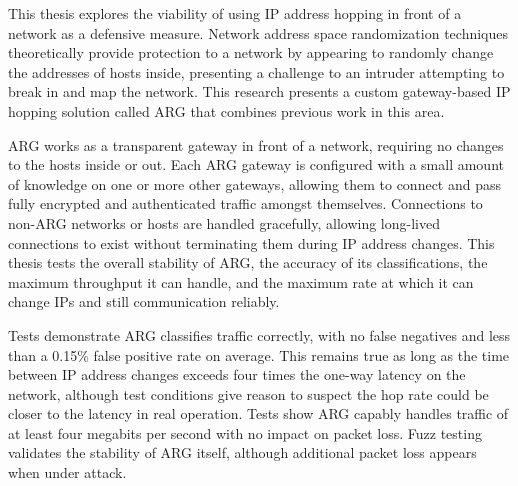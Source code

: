 \par This thesis explores the viability of using \ac{IP} address hopping in front of a network as a defensive measure. Network address space randomization techniques theoretically provide protection to a network by appearing to randomly change the addresses of hosts inside, presenting a challenge to an intruder attempting to break in and map the network. This research presents a custom gateway-based \ac{IP} hopping solution called \ac{ARG} that combines previous work in this area.

\par \ac{ARG} works as a transparent gateway in front of a network, requiring no changes to the hosts inside or out. Each \ac{ARG} gateway is configured with a small amount of knowledge on one or more other gateways, allowing them to connect and pass fully encrypted and authenticated traffic amongst themselves. Connections to non-\ac{ARG} networks or hosts are handled gracefully, allowing long-lived connections to exist without terminating them during \ac{IP} address changes. This thesis tests the overall stability of \ac{ARG}, the accuracy of its classifications, the maximum throughput it can handle, and the maximum rate at which it can change \acp{IP} and still communication reliably.

\par Tests demonstrate \ac{ARG} classifies traffic correctly, with no false negatives and less than a 0.15\% false positive rate on average. This remains true as long as the time between \ac{IP} address changes exceeds four times the one-way latency on the network, although test conditions give reason to suspect the hop rate could be closer to the latency in real operation. Tests show \ac{ARG} capably handles traffic of at least four megabits per second with no impact on packet loss. Fuzz testing validates the stability of \ac{ARG} itself, although additional packet loss appears when under attack.

\acresetall


